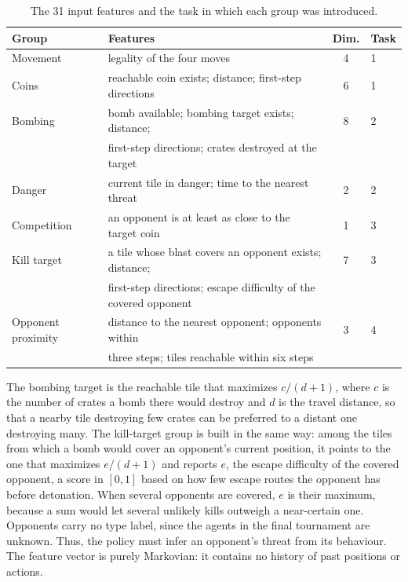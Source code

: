 \documentclass[11pt,a4paper]{report}
\begin{document}
	\begin{table}[htbp]
		\centering
		\small
		\begin{tabular}{llcl}
			\toprule
			Group & Features & Dim. & Task \\
			\midrule
			Movement & legality of the four moves & 4 & 1 \\
			Coins & reachable coin exists; distance; first-step directions & 6 & 1 \\
			Bombing & bomb available; bombing target exists; distance; & 8 & 2 \\
			& first-step directions; crates destroyed at the target & & \\
			Danger & current tile in danger; time to the nearest threat & 2 & 2 \\
			Competition & an opponent is at least as close to the target coin & 1 & 3 \\
			Kill target & a tile whose blast covers an opponent exists; distance; & 7 & 3 \\
			& first-step directions; escape difficulty of the covered opponent & & \\
			Opponent proximity & distance to the nearest opponent; opponents within & 3 & 4 \\
			& three steps; tiles reachable within six steps & & \\
			\bottomrule
		\end{tabular}
		\caption{The 31 input features and the task in which each group was introduced.}
		\label{tab:rhine_features}
	\end{table}
	
	The bombing target is the reachable tile that maximizes $c/(d+1)$, where $c$ is the number of crates a bomb there would destroy and $d$ is the travel distance, so that a nearby tile destroying few crates can be preferred to a distant one destroying many. The kill-target group is built in the same way: among the tiles from which a bomb would cover an opponent's current position, it points to the one that maximizes $e/(d+1)$ and reports $e$, the escape difficulty of the covered opponent, a score in $[0,1]$ based on how few escape routes the opponent has before detonation. When several opponents are covered, $e$ is their maximum, because a sum would let several unlikely kills outweigh a near-certain one. Opponents carry no type label, since the agents in the final tournament are unknown. Thus, the policy must infer an opponent's threat from its behaviour. The feature vector is purely Markovian: it contains no history of past positions or actions.
	
\end{document}
